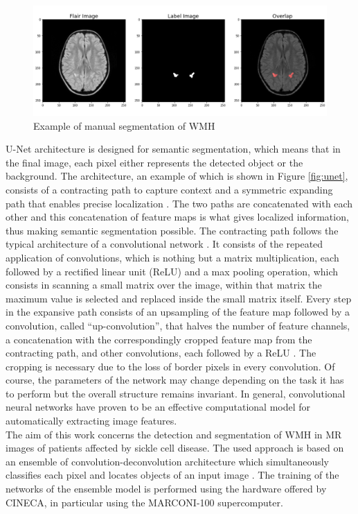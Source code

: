 \documentclass[12pt]{extarticle}
\begin{document}
\begin{figure}[h!]
    \centering
    \includegraphics[width = \textwidth]{images/overlap.png}
    \caption{Example of manual segmentation of WMH}
    \label{fig:manual_seg}
\end{figure}
\noindent
U-Net architecture is designed for semantic segmentation, which means that in the final image, each pixel either represents the detected object or the background.
The architecture, an example of which is shown in Figure \ref{fig:unet}, consists of a contracting path to capture
context and a symmetric expanding path that enables precise localization \cite{unet}.
The two paths are concatenated with each other and this concatenation of feature maps is what gives localized information, thus making semantic segmentation possible.
The contracting path follows the typical architecture of a convolutional network \cite{unet}. It consists of the repeated application of convolutions, which is nothing but a matrix multiplication, each followed by a rectified linear unit (ReLU) and a max pooling operation, which consists in scanning a small matrix over the image, within that matrix the maximum value is selected and replaced inside the small matrix itself.
Every step in the expansive path consists of an upsampling of the feature map followed by a convolution, called “up-convolution”, that halves the number of feature channels, a concatenation with the correspondingly cropped feature map from the contracting path, and other convolutions, each followed by a ReLU \cite{unet}. The cropping is necessary due to the loss of border pixels in every convolution.
Of course, the parameters of the network may change depending on the task it has to perform but the overall structure remains invariant.
In general, convolutional neural networks have proven to be an effective computational model for automatically extracting image features. \\[4pt]
The aim of this work concerns the detection and segmentation of WMH in MR images of patients affected by sickle cell disease.
The used approach is based on an ensemble of convolution-deconvolution architecture which simultaneously classifies each pixel and locates objects of an input image \cite{fully_conv}.
The training of the networks of the ensemble model is performed using the hardware offered by CINECA, in particular using the MARCONI-100 supercomputer.
\end{document}
